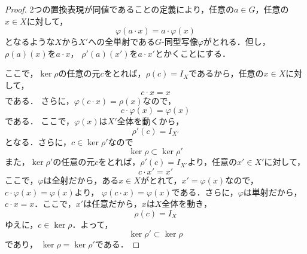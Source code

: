 \documentclass[dvipdfmx,uplatex,11pt]{jsarticle}
\theoremstyle{mytheorem}
\begin{document}
        \begin{proof}
            2つの置換表現が同値であることの定義により，任意の$ a\in G$，任意の$x \in X$に対して，
            \[
                \varphi (a \cdot x)=a \cdot \varphi (x)
            \]
            となるような$X$から$X'$への全単射である$G$-同型写像$\varphi$がとれる．但し，$\rho (a)(x)$を$a \cdot x$，
            $\rho '(a)(x')$を$a \cdot x'$とかくことにする．

            ここで，$\ker  \rho $の任意の元$c$をとれば，$\rho (c)=I_X$であるから，任意の$ x\in X$に対して，
            \[
            c \cdot x = x
            \]
            である．
            さらに，$\varphi (c \cdot x)= \rho (x)$なので，
            \[
            c \cdot \varphi (x)=\varphi (x)
            \]
            である．
            ここで，$\varphi (x)$は$X'$全体を動くから，
            \[
            \rho '(c)=I_{X'}
            \]
            となる．さらに，$ c \in \ker \rho' $なので
            \[
                \ker \rho \subset \ker \rho '
            \]
            また，$\ker \rho '$の任意の元$c$をとれば，$\rho '(c)= I_{X'}$より，任意の$x' \in X'$に対して，
            \[
                c \cdot x ' = x'
            \]
            ここで，$\varphi$は全射だから，ある$ x\in X$がとれて，$x' = \varphi(x)$なので，$ c \cdot \varphi (x)=\varphi (x)$より，
            $\varphi (c \cdot x)=\varphi (x)$である．さらに，$\varphi$は単射だから，$  c \cdot x = x$．ここで，$x'$は任意だから，$x$は$X$全体を動き，
            \[
                \rho (c)=I_X
            \]
            ゆえに，$ c\in \ker \rho$．よって，
            \[
                \ker \rho ' \subset \ker \rho
            \]
            であり， $\ker \rho = \ker \rho '$である．
        \end{proof}
\end{document}
